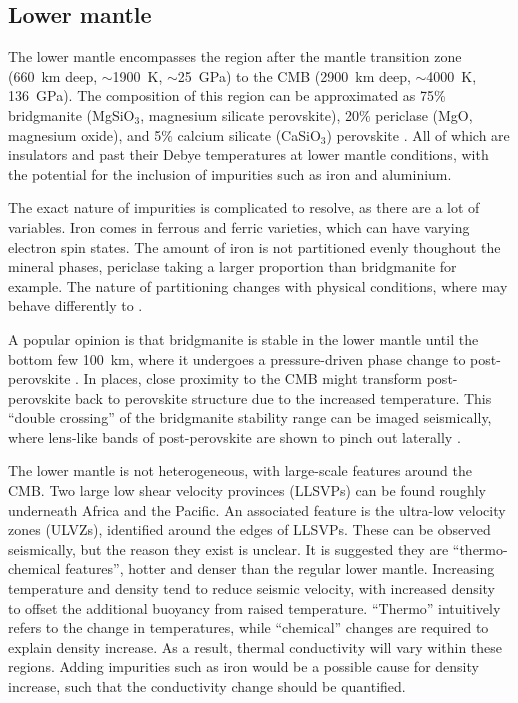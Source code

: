 \subsection{Lower mantle}

The lower mantle encompasses the region after the mantle transition zone (660~km deep, $\sim$1900~K, $\sim$25~GPa) to the CMB (2900~km deep, $\sim$4000~K, 136~GPa). The composition of this region can be approximated as 75\% bridgmanite (MgSiO$_3$, magnesium silicate perovskite), 20\% periclase (MgO, magnesium oxide), and  5\% calcium silicate (CaSiO$_3$) perovskite \citep{Tronnes2009}. All of which are insulators and past their Debye temperatures at lower mantle conditions, with the potential for the inclusion of impurities such as iron and aluminium.

The exact nature of impurities is complicated to resolve, as there are a lot of variables. Iron comes in ferrous and ferric varieties, which can have varying electron spin states. The amount of iron is not partitioned evenly thoughout the mineral phases, periclase taking a larger proportion than bridgmanite for example. The nature of partitioning changes with physical conditions, where \ppvs may behave differently to \bdg.

A popular opinion is that bridgmanite is stable in the lower mantle until the bottom few 100~km, where it undergoes a pressure-driven phase change to post-perovskite \citep{Murakami2004,Oganov2004}. In places, close proximity to the CMB might transform post-perovskite back to perovskite structure due to the increased temperature. This ``double crossing'' of the bridgmanite stability range can be imaged seismically, where lens-like bands of post-perovskite are shown to pinch out laterally \citep{Lay2006}.

The lower mantle is not heterogeneous, with large-scale features around the CMB. Two large low shear velocity provinces (LLSVPs) can be found roughly underneath Africa and the Pacific. An associated feature is the ultra-low velocity zones (ULVZs), identified around the edges of LLSVPs. These can be observed seismically, but the reason they exist is unclear. It is suggested they are ``thermo-chemical features'', hotter and denser than the regular lower mantle. Increasing temperature and density tend to reduce seismic velocity, with increased density to offset the additional buoyancy from raised temperature. ``Thermo'' intuitively refers to the change in temperatures, while ``chemical'' changes are required to explain density increase. As a result, thermal conductivity will vary within these regions. Adding impurities such as iron would be a possible cause for density increase, such that the conductivity change should be quantified.

